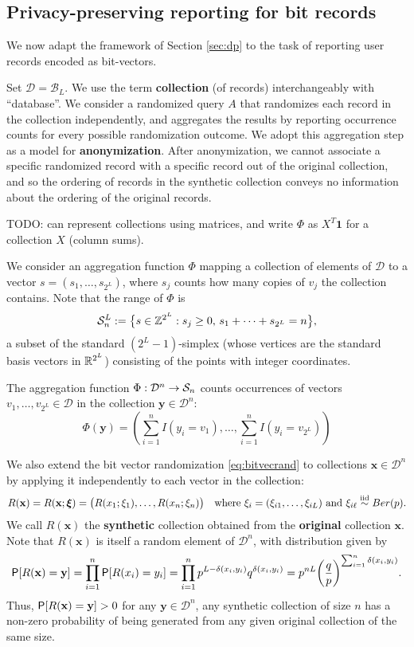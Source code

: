 \documentclass[11pt,draft]{article}
\newcommand{\Dsp}{\mathcal{D}}
\newcommand{\Ssp}{\mathcal{S}}
\newcommand{\Bsp}{\mathcal{B}}
\newcommand{\xv}{\mathbf{x}}
\newcommand{\yv}{\mathbf{y}}
\begin{document}
\subsection{Privacy-preserving reporting for bit records}

We now adapt the framework of Section \ref{sec:dp} to the task of reporting
user records encoded as bit-vectors.

Set $\Dsp = \Bsp_L$. We use the term \textbf{collection} (of records)
interchangeably with ``database''.
We consider a randomized query $A$ that randomizes each record in the
collection independently, and aggregates the results by reporting occurrence
counts for every possible randomization outcome.
We adopt this aggregation step as a model for \textbf{anonymization}.
After anonymization, we cannot associate a specific randomized record with
a specific record out of the original collection, and so the ordering of
records in the synthetic collection conveys no information about the ordering
of the original records.

TODO: can represent collections using matrices, and write $\Phi$ as 
$X^T\mathbf{1}$ for a collection $X$ (column sums).

We consider an aggregation function $\Phi$ mapping a collection of elements of
$\Dsp$ to a vector $s = (s_1,\dots,s_{2^L})$, where $s_j$ counts how
many copies of $v_j$ the collection contains.
Note that the range of $\Phi$ is
\[ \Ssp_n^L := \big\{ s \in \Z^{2^L}: s_j \geq 0,\,
s_1 +\cdots + s_{2^L} = n\big\}, \]
a subset of the standard $(2^L-1)$-simplex (whose vertices are the standard
basis vectors in $\mathbb{R}^{2^L}$) consisting of the points with integer coordinates.

\begin{defn}
The aggregation function $\map{\Phi}{\Dsp^n}{\Ssp_n}$ counts occurrences of
vectors $v_1,\dots, v_{2^L} \in \Dsp$ in the collection $\yv \in \Dsp^n$:
\[ \Phi(\yv) = \left(\sum_{i = 1}^n I(y_i = v_1),\dots,
\sum_{i = 1}^n I(y_i = v_{2^L}) \right)
\]
\end{defn}

We also extend the bit vector randomization \eqref{eq:bitvecrand} to
collections $\xv\in\Dsp^n$ by applying it independently to each vector in the
collection:
\[ R(\xv) = R(\xv;\boldsymbol{\xi})
= \big(R(x_1;\xi_1),\dots,R(x_n; \xi_n)\big)
\quad\text{where } \xi_i = (\xi_{i1},\dots,\xi_{iL}) \text{ and }
\xi_{i\ell} \iid Ber(p). \]
We call $R(\xv)$ the \textbf{synthetic} collection obtained from the
\textbf{original} collection $\xv$.
Note that $R(\xv)$ is itself a random element of $\Dsp^n$, with distribution
given by
\[ \P[R(\xv) = \yv] = \prod_{i=1}^n \P[R(x_i) = y_i] =
\prod_{i=1}^n p^{L-\delta(x_i,y_i)}q^{\delta(x_i,y_i)} =
p^{nL} \bigg(\frac{q}{p}\bigg)^{\sum_{i=1}^n \delta(x_i, y_i)}.
\]
Thus, $\P[R(\xv) = \yv] > 0$ for any $\yv\in\Dsp^n$, \ie any synthetic
collection of size $n$ has a non-zero probability of being generated from any
given original collection of the same size.
\end{document}
